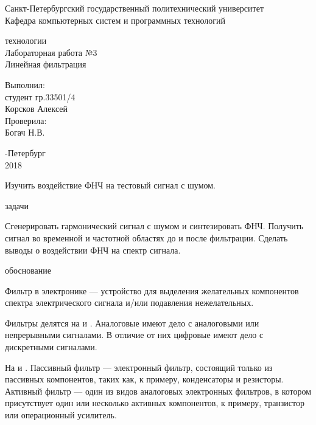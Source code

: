\documentclass[a4paper,12pt]{article}
\begin{document}
\begin{center}
Санкт-Петербургский государственный политехнический университет
\\Кафедра компьютерных систем и программных технологий
\end{center}
\vspace*{10em plus .6em minus .5em}

\begin{center}
{ технологии
\\Лабораторная работа №3
\\Линейная фильтрация}
\end{center}

\vspace*{5em plus .6em minus .5em}
\begin{flushright}
Выполнил:\\студент гр.33501/4\\Корсков Алексей\\Проверила:\\Богач Н.В.
\end{flushright}

\vspace*{15em plus .6em minus .5em}
\begin{center}
{-Петербург
\\2018}
\end{center}
\pagestyle{empty}
\newpage
\pagestyle{plain}
{}

Изучить воздействие ФНЧ на тестовый сигнал с шумом.

{ задачи}

Сгенерировать гармонический сигнал с шумом и синтезировать ФНЧ. Получить сигнал во временной и частотной областях до и после фильтрации. Сделать выводы о воздействии ФНЧ на спектр сигнала.

{ обоснование}

Фильтр в электронике — устройство для выделения желательных компонентов спектра электрического сигнала и/или подавления нежелательных.

Фильтры делятся на {} и {}. Аналоговые  имеют дело с аналоговыми или непрерывными сигналами. В отличие от них цифровые имеют дело с дискретными сигналами.

На {} и {}. Пассивный фильтр — электронный фильтр, состоящий только из пассивных компонентов, таких как, к примеру, конденсаторы и резисторы. Активный фильтр — один из видов аналоговых электронных фильтров, в котором присутствует один или несколько активных компонентов, к примеру, транзистор или операционный усилитель.
\end{document}

